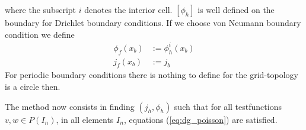 \documentclass[a4paper,12pt]{scrartcl}
\begin{document}
where the subscript $i$ denotes the interior cell. $[\phi_h]$ is well
defined on the boundary for Drichlet boundary conditions. If we 
choose von Neumann boundary condition we define
\begin{subequations}
    \begin{align}
        \phi_f(x_b) &:= \phi^i_h(x_b) \\
        j_f(x_b) &:= j_b
        \label{eq:dg_neumann_boundary_fluxes}
    \end{align}
\end{subequations}
For periodic boundary conditions there is nothing to define for 
the grid-topology is a circle then. 

The method now consists in finding $(j_h, \phi_h)$ such that for all 
testfunctions $v, w\in P(I_n)$, in all elements $I_n$, equations 
(\ref{eq:dg_poisson}) are satisfied.
\end{document}

